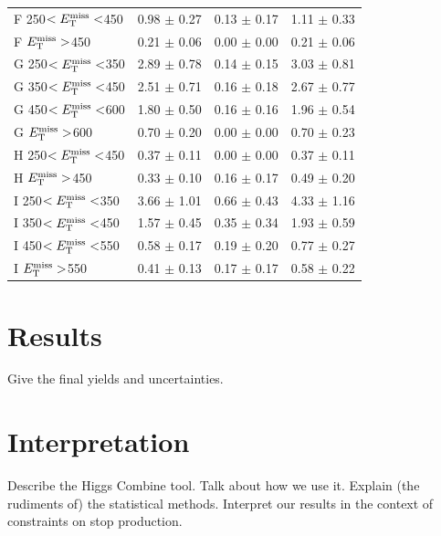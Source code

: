 \begin{table}[htb]
\begin{tabular}{|l|cc|c|}
 F 250$<E_\text{T}^\text{miss}<$450 & 0.98 $\pm$ 0.27   & 0.13 $\pm$ 0.17   & 1.11 $\pm$ 0.33   \\
 F $E_\text{T}^\text{miss}>$450 & 0.21 $\pm$ 0.06   & 0.00 $\pm$ 0.00   & 0.21 $\pm$ 0.06   \\
 G 250$<E_\text{T}^\text{miss}<$350 & 2.89 $\pm$ 0.78   & 0.14 $\pm$ 0.15   & 3.03 $\pm$ 0.81   \\
 G 350$<E_\text{T}^\text{miss}<$450 & 2.51 $\pm$ 0.71   & 0.16 $\pm$ 0.18   & 2.67 $\pm$ 0.77   \\
 G 450$<E_\text{T}^\text{miss}<$600 & 1.80 $\pm$ 0.50   & 0.16 $\pm$ 0.16   & 1.96 $\pm$ 0.54   \\
 G $E_\text{T}^\text{miss}>$600 & 0.70 $\pm$ 0.20   & 0.00 $\pm$ 0.00   & 0.70 $\pm$ 0.23   \\
 H 250$<E_\text{T}^\text{miss}<$450 & 0.37 $\pm$ 0.11   & 0.00 $\pm$ 0.00   & 0.37 $\pm$ 0.11   \\
 H $E_\text{T}^\text{miss}>$450 & 0.33 $\pm$ 0.10   & 0.16 $\pm$ 0.17   & 0.49 $\pm$ 0.20   \\
 I 250$<E_\text{T}^\text{miss}<$350 & 3.66 $\pm$ 1.01   & 0.66 $\pm$ 0.43   & 4.33 $\pm$ 1.16   \\
 I 350$<E_\text{T}^\text{miss}<$450 & 1.57 $\pm$ 0.45   & 0.35 $\pm$ 0.34   & 1.93 $\pm$ 0.59   \\
 I 450$<E_\text{T}^\text{miss}<$550 & 0.58 $\pm$ 0.17   & 0.19 $\pm$ 0.20   & 0.77 $\pm$ 0.27   \\
 I $E_\text{T}^\text{miss}>$550 & 0.41 $\pm$ 0.13   & 0.17 $\pm$ 0.17   & 0.58 $\pm$ 0.22   \\
\hline
\end{tabular}
\end{table}

\section{Results}
\label{sec:stop:results}

Give the final yields and uncertainties.

\section{Interpretation}
\label{sec:stop:interp}

Describe the Higgs Combine tool.
Talk about how we use it.
Explain (the rudiments of) the statistical methods.
Interpret our results in the context of constraints on stop production.

